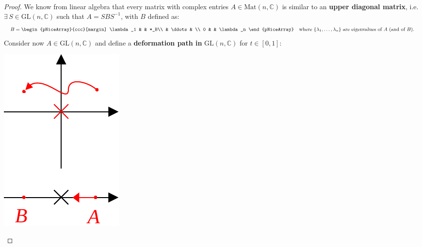 \documentclass[../main.tex]{subfiles}
\begin{document}
\begin{proof}
We know from linear algebra that every matrix with complex entries $A\in\text{Mat}(n,\mathbb{C})$ is similar to an \textbf{upper diagonal matrix}, i.e. $\exists\,S\in \text{GL}(n,\mathbb{C})$ such that $A=SBS^{-1}$, with $B$ defined as:
\[
B=
\begin{pNiceArray}{ccc}[margin]
\lambda_1 & & *_B\\ 
 & \ddots & \\
 0 & & \lambda_n 
\end{pNiceArray}
\quad \text{where } \{\lambda_1,\dots,\lambda_n\} \text{ are eigenvalues of $A$ (and of $B$).}
\]
Consider now $A\in\text{GL}(n,\mathbb{C})$ and define a \textbf{deformation path in} $\textrm{GL}(n,\mathbb{C})$ for $t\in[0,1]$:
\begin{marginfigure}
	\includegraphics[width=1\linewidth]{images/ex-gl-conn.pdf}

\end{marginfigure}
\end{proof}
\end{document}
